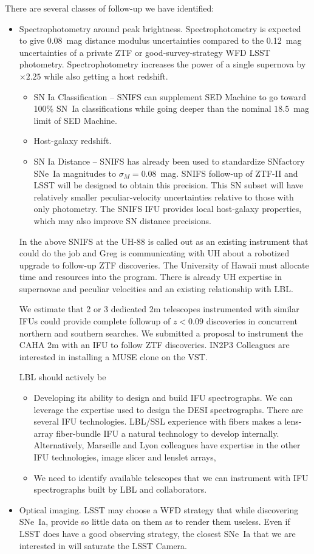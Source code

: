 There are several classes of follow-up we have identified:
\begin{itemize}
\item Spectrophotometry around peak brightness.  Spectrophotometry is expected to give 0.08~mag distance modulus uncertainties compared
to the 0.12~mag uncertainties of a private ZTF or good-survey-strategy WFD LSST photometry.  Spectrophotometry increases the power
of a single supernova by $\times 2.25$ while also getting a host redshift.
\begin{itemize}
\item SN Ia Classification -- SNIFS can supplement SED Machine to go toward 100\% SN~Ia classifications
while going deeper than the nominal $18.5$~mag limit of SED Machine.
\item Host-galaxy redshift.
\item SN Ia Distance -- SNIFS has already been used to standardize SNfactory SNe~Ia magnitudes to $\sigma_M=0.08$~mag.  SNIFS follow-up
of ZTF-II and LSST will be
designed to obtain this precision.  This SN subset  will have relatively smaller peculiar-velocity uncertainties relative to 
those with only photometry.  The SNIFS IFU provides local host-galaxy properties, which may also improve SN distance precisions.
\end{itemize}

In the above 
SNIFS at the UH-88 is called out as an existing instrument that could do the job and Greg is communicating with UH about
a robotized upgrade to follow-up ZTF discoveries.  The University of Hawaii must allocate time and resources into the program.  There is already UH expertise in supernovae and peculiar velocities and an existing relationship
with LBL.

We estimate that 2 or 3 dedicated 2m telescopes instrumented with similar IFUs could provide
complete followup of $z<0.09$ discoveries in concurrent northern and southern searches.
We submitted a proposal to instrument the CAHA 2m with
an IFU to follow ZTF discoveries.  IN2P3 Colleagues are interested in installing a MUSE clone on the VST.

LBL should actively be
\begin{itemize}
\item Developing its ability to design and build IFU spectrographs.  We can leverage the expertise used to design the DESI spectrographs.
There are several IFU technologies.  LBL/SSL experience with fibers makes a lens-array fiber-bundle IFU a natural technology to develop
internally.
Alternatively, Marseille and Lyon colleagues have expertise in the other IFU technologies, image slicer and lenslet arrays,
\item We need to identify available telescopes that we can instrument with  IFU spectrographs
built by LBL and collaborators.
\end{itemize}
\item Optical imaging.  LSST may choose a WFD strategy that while discovering SNe~Ia, provide so little data on them
as to render them useless.  Even if LSST does have a good observing strategy, the closest SNe~Ia that we are interested in
will saturate the LSST Camera. 


\end{itemize}
